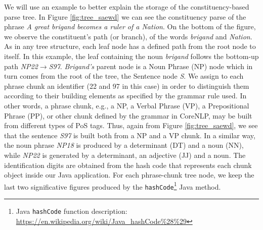 We will use an example to better explain the storage of the constituency-based parse tree. In Figure \ref{fig:tree_saewd} we can see the constituency parse of the phrase  \textit{A great brigand becomes a ruler of a Nation}. On the bottom of the figure, we observe the constituent's path (or branch), of the words \textit{brigand} and \textit{Nation}. As in any tree structure, each leaf node has a defined path from the root node to itself. In this example, the leaf containing the noun \textit{brigand} 
 follows the bottom-up path \textit{NP22}$\rightarrow$\textit{S97}. \textit{Brigand's} parent node is a Noun Phrase (NP) node which in turn comes from the root of the tree, the Sentence node \textit{S}. We assign to each phrase chunk an identifier (22 and 97 in this case) in order to distinguish them according to their building elements as specified by the grammar rule used.
  In other words, a phrase chunk, e.g., a NP, a Verbal Phrase (VP), a Prepositional Phrase (PP), or other chunk defined by the grammar in CoreNLP, may be built from different types of PoS tags. Thus, again from Figure \ref{fig:tree_saewd}, we see that the sentence \textit{S97} is  built both from a NP and a VP chunk. 
 In a similar way, the noun phrase \textit{NP18} is produced by a determinant (DT) and a noun (NN), while  \textit{NP22} is generated by a determinant, an adjective (JJ) and a noun.
  The identification digits are obtained from the hash code that represents each chunk object inside our Java application. For each phrase-chunk tree node, we keep the last two significative figures produced by the \texttt{hashCode}\footnote{Java \texttt{hashCode} function description: \url{https://en.wikipedia.org/wiki/Java\_hashCode\%28\%29}} Java method.


